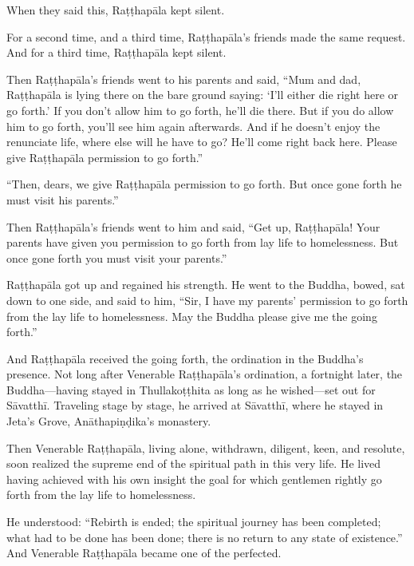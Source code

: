 \documentclass[12pt,openany]{book}%
\begin{document}
When they said this, \textsanskrit{Raṭṭhapāla} kept silent. 

For a second time, and a third time, \textsanskrit{Raṭṭhapāla}’s friends made the same request. And for a third time, \textsanskrit{Raṭṭhapāla} kept silent. 

Then \textsanskrit{Raṭṭhapāla}’s friends went to his parents and said, “Mum and dad, \textsanskrit{Raṭṭhapāla} is lying there on the bare ground saying: ‘I’ll either die right here or go forth.’ If you don’t allow him to go forth, he’ll die there. But if you do allow him to go forth, you’ll see him again afterwards. And if he doesn’t enjoy the renunciate life, where else will he have to go? He’ll come right back here. Please give \textsanskrit{Raṭṭhapāla} permission to go forth.” 

“Then, dears, we give \textsanskrit{Raṭṭhapāla} permission to go forth. But once gone forth he must visit his parents.” 

Then \textsanskrit{Raṭṭhapāla}’s friends went to him and said, “Get up, \textsanskrit{Raṭṭhapāla}! Your parents have given you permission to go forth from lay life to homelessness. But once gone forth you must visit your parents.” 

\textsanskrit{Raṭṭhapāla} got up and regained his strength. He went to the Buddha, bowed, sat down to one side, and said to him, “Sir, I have my parents’ permission to go forth from the lay life to homelessness. May the Buddha please give me the going forth.” 

And \textsanskrit{Raṭṭhapāla} received the going forth, the ordination in the Buddha’s presence. Not long after Venerable \textsanskrit{Raṭṭhapāla}’s ordination, a fortnight later, the Buddha—having stayed in \textsanskrit{Thullakoṭṭhita} as long as he wished—set out for \textsanskrit{Sāvatthī}. Traveling stage by stage, he arrived at \textsanskrit{Sāvatthī}, where he stayed in Jeta’s Grove, \textsanskrit{Anāthapiṇḍika}’s monastery. 

Then Venerable \textsanskrit{Raṭṭhapāla}, living alone, withdrawn, diligent, keen, and resolute, soon realized the supreme end of the spiritual path in this very life. He lived having achieved with his own insight the goal for which gentlemen rightly go forth from the lay life to homelessness. 

He understood: “Rebirth is ended; the spiritual journey has been completed; what had to be done has been done; there is no return to any state of existence.” And Venerable \textsanskrit{Raṭṭhapāla} became one of the perfected. 
\end{document}
